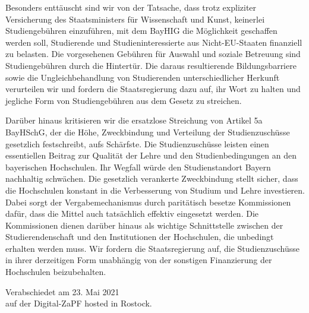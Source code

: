 \documentclass[DIV=calc]{scrartcl}
\begin{document}
Besonders enttäuscht sind wir von der Tatsache, dass trotz expliziter Versicherung des Staatsministers für Wissenschaft und Kunst, keinerlei Studiengebühren einzuführen, mit dem BayHIG die Möglichkeit geschaffen werden soll, Studierende und Studieninteressierte aus Nicht-EU-Staaten finanziell zu belasten. Die vorgesehenen Gebühren für Auswahl und soziale Betreuung sind Studiengebühren durch die Hintertür. Die daraus resultierende Bildungsbarriere sowie die Ungleichbehandlung von Studierenden unterschiedlicher Herkunft verurteilen wir und fordern die Staatsregierung dazu auf, ihr Wort zu halten
und jegliche Form von Studiengebühren aus dem Gesetz zu streichen.

Darüber hinaus kritisieren wir die ersatzlose Streichung von Artikel 5a BayHSchG, der die Höhe, Zweckbindung und Verteilung der Studienzuschüsse gesetzlich festschreibt, aufs Schärfste. Die Studienzuschüsse leisten einen essentiellen Beitrag zur Qualität der Lehre und den Studienbedingungen an den bayerischen Hochschulen. Ihr Wegfall würde den Studienstandort Bayern nachhaltig schwächen. Die gesetzlich verankerte Zweckbindung stellt sicher, dass die Hochschulen konstant in die Verbesserung von Studium und Lehre investieren. Dabei sorgt der Vergabemechanismus durch paritätisch besetze Kommissionen dafür, dass die Mittel auch tatsächlich effektiv eingesetzt werden. Die Kommissionen dienen darüber hinaus als wichtige Schnittstelle zwischen der Studierendenschaft und den Institutionen der Hochschulen, die unbedingt erhalten werden muss. Wir fordern die Staatsregierung auf, die Studienzuschüsse in ihrer derzeitigen Form unabhängig von der sonstigen Finanzierung der Hochschulen beizubehalten.

\vfill
\begin{flushright}
	Verabschiedet am 23. Mai 2021 \\
	auf der Digital-ZaPF hosted in Rostock.
\end{flushright}
\end{document}
